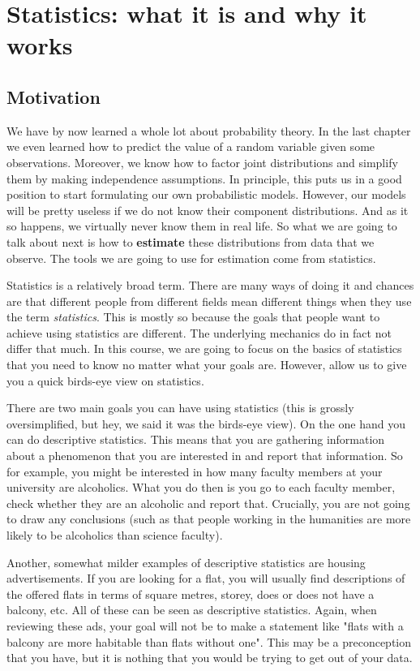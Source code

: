 \chapter{Statistics: what it is and why it works}

\section{Motivation}
We have by now learned a whole lot about probability theory. In the last chapter we even learned how to predict the value
of a random variable given some observations. Moreover, we know how to factor joint distributions and simplify them by making
independence assumptions. In principle, this puts us in a good position to start formulating our
own probabilistic models. However, our models will be pretty useless if we do not know their component distributions. And as
it so happens, we virtually never know them in real life. So what we are going to talk about next is how to \textbf{estimate}
these distributions from data that we observe. The tools we are going to use for estimation come from statistics.

Statistics is a relatively broad term. There are many ways of doing it and chances are that different people from different
fields mean different things when they use the term \textit{statistics}. This is mostly so because the goals that people 
want to achieve using statistics are different. The underlying mechanics do in fact not differ that much. In this course,
we are going to focus on the basics of statistics that you need to know no matter what your goals are. However, allow us
to give you a quick birds-eye view on statistics. 

There are two main goals you can have using statistics (this is grossly oversimplified, but hey, we said it was the birds-eye
view). On the one hand you can do descriptive statistics. This means that you are gathering information about a phenomenon
that you are interested in and report that information. So for example, you might be interested in how many faculty members
at your university are alcoholics. What you do then is you go to each faculty member, check whether they are an alcoholic
and report that. Crucially, you are not going to draw any conclusions (such as that people working in the humanities are more
likely to be alcoholics than science faculty).

Another, somewhat milder examples of descriptive statistics are housing advertisements. If you are looking for a flat, you will usually
find descriptions of the offered flats in terms of square metres, storey, does or does not have a balcony, etc. All of these
can be seen as descriptive statistics. Again, when reviewing these ads, your goal will not be to make a statement like "flats
with a balcony are more habitable than flats without one". This may be a preconception that you have, but it is nothing that
you would be trying to get out of your data.

